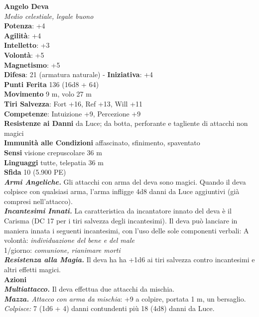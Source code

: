 \begin{multicols}{2}
\medskip\textbf{Angelo Deva}\\
\emph{Medio celestiale, legale buono}\\
\textbf{Potenza}: +4\\
\textbf{Agilità}: +4\\
\textbf{Intelletto}: +3\\
\textbf{Volontà}: +5\\
\textbf{Magnetismo}: +5\\
\textbf{Difesa}: 21 (armatura naturale) - \textbf{Iniziativa}: +4\\
\textbf{Punti Ferita} 136 (16d8 + 64)\\
\textbf{Movimento} 9 m, volo 27 m\\
\textbf{Tiri Salvezza}: Fort +16, Ref +13, Will +11\\
\textbf{Competenze}: Intuizione +9, Percezione +9\\
\textbf{Resistenze ai Danni} da Luce; da botta, perforante e tagliente di attacchi non magici\\
\textbf{Immunità alle Condizioni} affascinato, sfinimento, spaventato\\
\textbf{Sensi} visione crepuscolare 36 m\\
\textbf{Linguaggi} tutte, telepatia 36 m\\
\textbf{Sfida} 10 (5.900 PE)\smallskip\\
\emph{\textbf{Armi Angeliche.}} Gli attacchi con arma del deva sono magici. Quando il deva colpisce con qualsiasi arma, l'arma infligge 4d8 danni da Luce aggiuntivi (già compresi nell'attacco).\\
\emph{\textbf{Incantesimi Innati.}} La caratteristica da incantatore innato del deva è il Carisma (DC 17 per i tiri salvezza degli incantesimi). Il deva può lanciare in maniera innata i seguenti incantesimi, con l'uso delle sole componenti verbali: 
A volontà: \emph{individuazione del bene e del male}\\
1/giorno: \emph{comunione, rianimare morti}\\
\emph{\textbf{Resistenza alla Magia.}} Il deva ha ha +1d6 ai tiri salvezza contro incantesimi e altri effetti magici.\\
\smallskip\textbf{Azioni}\\
\emph{\textbf{Multiattacco.}} Il deva effettua due attacchi da mischia.\\
\emph{\textbf{Mazza.} Attacco con arma da mischia}: +9 a colpire, portata 1 m, un bersaglio.\\ 
\emph{Colpisce:} 7 (1d6 + 4) danni contundenti più 18 (4d8) danni da Luce.\\

\end{multicols}
